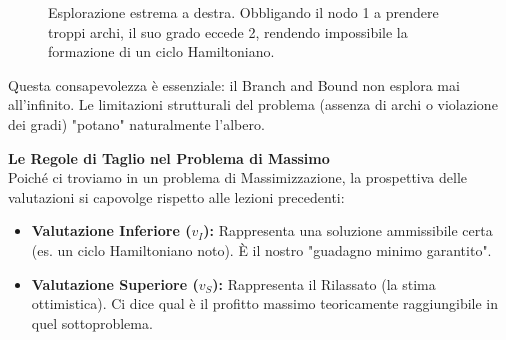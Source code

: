 \documentclass[12pt, a4paper]{article}
\newcommand{\separatore}{\noindent{\color{titlecolor!50}\rule{\textwidth}{0.6pt}}}
\begin{document}
	\begin{figure}[H]
		\centering
		\caption{Esplorazione estrema a destra. Obbligando il nodo 1 a prendere troppi archi, il suo grado eccede 2, rendendo impossibile la formazione di un ciclo Hamiltoniano.}
	\end{figure}
	Questa consapevolezza è essenziale: il Branch and Bound non esplora mai all'infinito. Le limitazioni strutturali del problema (assenza di archi o violazione dei gradi) "potano" naturalmente l'albero.
	
	\vspace{0.6cm}
	\separatore
	\vspace{0.4cm}
	
	\textbf{Le Regole di Taglio nel Problema di Massimo}\\
	Poiché ci troviamo in un problema di Massimizzazione, la prospettiva delle valutazioni si capovolge rispetto alle lezioni precedenti:
	\begin{itemize}[label=\textcolor{titlecolor}{\Large\textbullet}, itemsep=2pt, leftmargin=1.5cm]
		\item \textbf{Valutazione Inferiore ($v_I$):} Rappresenta una soluzione ammissibile certa (es. un ciclo Hamiltoniano noto). È il nostro "guadagno minimo garantito".
		\item \textbf{Valutazione Superiore ($v_S$):} Rappresenta il Rilassato (la stima ottimistica). Ci dice qual è il profitto massimo teoricamente raggiungibile in quel sottoproblema.
	\end{itemize}
	
\end{document}
